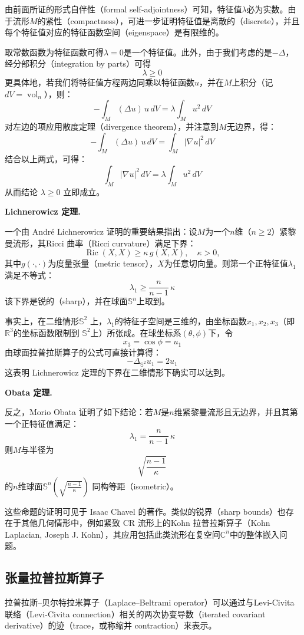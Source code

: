 由前面所证的形式自伴性（formal self-adjointness）可知，特征值$\lambda$必为实数。由于流形$M$的紧性（compactness），可进一步证明特征值是离散的（discrete），并且每个特征值对应的特征函数空间（eigenspace）是有限维的。

取常数函数为特征函数可得$\lambda = 0$是一个特征值。此外，由于我们考虑的是$-\Delta$，经分部积分（integration by parts）可得
\[
\lambda \ge 0~
\]
更具体地，若我们将特征值方程两边同乘以特征函数$u$，并在$M$上积分（记$dV = \operatorname{vol}_{n}$），则：
\[
-\int_{M} (\Delta u)\, u\, dV = \lambda \int_{M} u^{2}\, dV~
\]
对左边的项应用散度定理（divergence theorem），并注意到$M$无边界，得：
\[
-\int_{M} (\Delta u)\, u\, dV = \int_{M} |\nabla u|^{2}\, dV~
\]
结合以上两式，可得：
\[
\int_{M} |\nabla u|^{2}\, dV = \lambda \int_{M} u^{2}\, dV~
\]
从而结论 $\lambda \ge 0$ 立即成立。

\textbf{Lichnerowicz 定理.}

一个由 André Lichnerowicz 证明的重要结果指出：设$M$为一个$n$维（$n \ge 2$）紧黎曼流形，其Ricci 曲率（Ricci curvature）满足下界：
\[
\operatorname{Ric}(X, X) \ge \kappa\, g(X, X), \quad \kappa > 0,~
\]
其中$g(\cdot, \cdot)$为度量张量（metric tensor），$X$为任意切向量。则第一个正特征值$\lambda_{1}$满足不等式：
\[
\lambda_{1} \ge \frac{n}{n-1}\, \kappa~
\]
该下界是锐的（sharp），并在球面$\mathbb{S}^{n}$上取到。

事实上，在二维情形$\mathbb{S}^{2}$ 上，$\lambda_{1}$的特征子空间是三维的，由坐标函数$x_{1}, x_{2}, x_{3}$（即$\mathbb{R}^{3}$的坐标函数限制到 $\mathbb{S}^{2}$上）所张成。在球坐标系$(\theta, \phi)$下，令
\[
x_{3} = \cos \phi = u_{1}~
\]
由球面拉普拉斯算子的公式可直接计算得：
\[
-\Delta_{\mathbb{S}^{2}} u_{1} = 2u_{1}~
\]
这表明 Lichnerowicz 定理的下界在二维情形下确实可以达到。

\textbf{Obata 定理.}

反之，Morio Obata 证明了如下结论：若$M$是$n$维紧黎曼流形且无边界，并且其第一个正特征值满足：
\[
\lambda_{1} = \frac{n}{n-1}\, \kappa~
\]
则$M$与半径为
\[
\sqrt{\frac{n-1}{\kappa}}~
\]
的$n$维球面$\mathbb{S}^{n}\!\left(\sqrt{\frac{n-1}{\kappa}}\right)$ 同构等距（isometric）。

这些命题的证明可见于 Isaac Chavel 的著作。类似的锐界（sharp bounds）也存在于其他几何情形中，例如紧致 CR 流形上的Kohn 拉普拉斯算子（Kohn Laplacian, Joseph J. Kohn），其应用包括此类流形在复空间$\mathbb{C}^{n}$中的整体嵌入问题。
\subsection{张量拉普拉斯算子}
拉普拉斯–贝尔特拉米算子（Laplace–Beltrami operator）可以通过与Levi-Civita 联络（Levi-Civita connection）相关的两次协变导数（iterated covariant derivative）的迹（trace，或称缩并 contraction）来表示。

